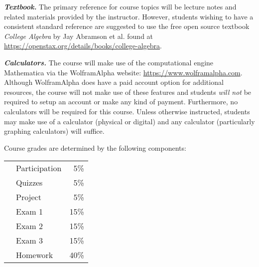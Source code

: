 \documentclass[11pt,letterpaper]{article}
\begin{document}
{\itshape\bfseries\color{stacred}Textbook.} The primary reference for course topics will be lecture notes and related materials provided by the instructor. However, students wishing to have a consistent standard reference are suggested to use the free open source textbook \textit{College Algebra} by Jay Abramson et al. found at \url{https://openstax.org/details/books/college-algebra}. \pspace

{\itshape\bfseries\color{stacred}Calculators.} The course will make use of the computational engine Mathematica via the WolframAlpha website: \url{https://www.wolframalpha.com}. Although WolframAlpha does have a paid account option for additional resources, the course will not make use of these features and students {\itshape will not} be required to setup an account or make any kind of payment. Furthermore, no calculators will be required for this course. Unless otherwise instructed, students may make use of a calculator (physical or digital) and any calculator (particularly graphing calculators) will suffice. 
\sectionbreak









Course grades are determined by the following components: \par
	\begin{table}[!ht]
        \begin{tabular}{clr}
	& Participation & 5\% \\
	& Quizzes & 5\% \\
	& Project & 5\% \\
	& Exam 1 & 15\% \\
	& Exam 2 & 15\% \\
	& Exam 3 & 15\% \\
	& Homework & 40\%
        \end{tabular} 
        \end{table}
\sectionbreak
\end{document}

